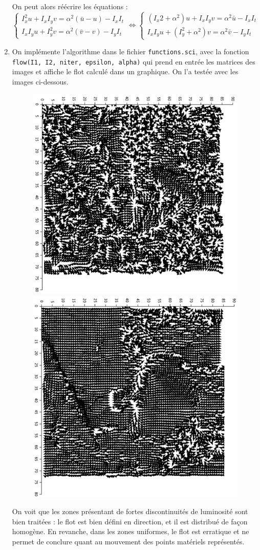 \begin{enumerate}[questions]
On peut alors réécrire les équations :
\[ 
\begin{cases*}
I_x^2u + I_xI_yv = \alpha^2(\bar{u} - u) - I_xI_t \\
I_xI_yu + I_y^2v = \alpha^2(\bar{v} - v) - I_yI_t
\end{cases*}
\iff 
\begin{cases*}
(I_x2 + \alpha^2)u + I_xI_yv = \alpha^2\bar{u} - I_xI_t \\
I_xI_yu + (I_y^2 + \alpha^2)v = \alpha^2\bar{v} - I_yI_t
\end{cases*}
\]

\item On implémente l'algorithme dans le fichier \verb|functions.sci|, avec la fonction \verb|flow(I1, I2, niter, epsilon, alpha)| qui prend en entrée les matrices des images et affiche le flot calculé dans un graphique. On l'a testée avec les images ci-dessous.
\begin{figure}[!h]
\centering
\includegraphics[width=.45\textwidth]{img/q7-img-1}
\hfill
\includegraphics[width=.45\textwidth]{img/q7-img-2}
\end{figure}
On voit que les zones présentant de fortes discontinuités de luminosité sont bien traitées : le flot est bien défini en direction, et il est distribué de façon homogène. En revanche, dans les zones uniformes, le flot est erratique et ne permet de conclure quant au mouvement des points matériels représentés.
\end{enumerate}